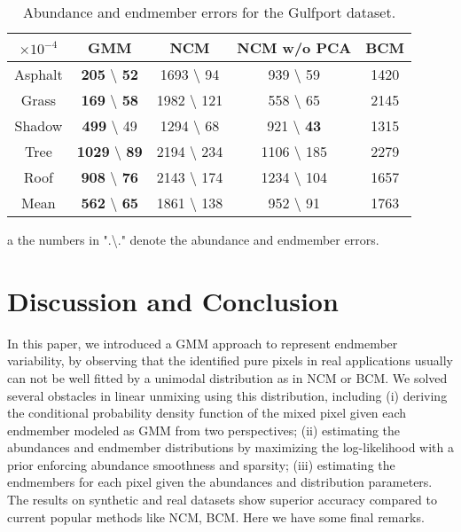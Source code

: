 \documentclass[twocolumn,english]{IEEEtran}
\providecommand{\tabularnewline}{\\}
\theoremstyle{plain}
\begin{document}
\begin{table}
\centering

\caption{Abundance and endmember errors for the Gulfport dataset.}

\begin{threeparttable}
\begin{centering}
\begin{tabular}{|c|c|c|c|c|}
\hline 
$\times10^{-4}$ &
GMM &
NCM &
NCM w/o PCA &
BCM\tabularnewline
\hline 
\hline 
Asphalt &
\textbf{205} \textbackslash{}\textbf{ 52}\tnote{a} &
1693 \textbackslash{}\textbf{ }94 &
939 \textbackslash{}\textbf{ }59 &
1420\tabularnewline
\hline 
Grass &
\textbf{169} \textbackslash{} \textbf{58} &
1982 \textbackslash{} 121 &
558 \textbackslash{} 65 &
2145\tabularnewline
\hline 
Shadow &
\textbf{499} \textbackslash{} 49 &
1294 \textbackslash{} 68 &
921 \textbackslash{} \textbf{43} &
1315\tabularnewline
\hline 
Tree &
\textbf{1029} \textbackslash{} \textbf{89} &
2194 \textbackslash{} 234 &
1106 \textbackslash{} 185 &
2279\tabularnewline
\hline 
Roof &
\textbf{908} \textbackslash{} \textbf{76} &
2143 \textbackslash{} 174 &
1234 \textbackslash{} 104 &
1657\tabularnewline
\hline 
Mean &
\textbf{562} \textbackslash{} \textbf{65} &
1861 \textbackslash{} 138 &
952 \textbackslash{} 91 &
1763\tabularnewline
\hline 
\end{tabular}
\par\end{centering}
\label{table:gulfport_abundances_error}

\begin{tablenotes} \item [a] the numbers in ".\textbackslash." denote the abundance and endmember errors. \end{tablenotes} \end{threeparttable}
\end{table}


\section{Discussion and Conclusion}

In this paper, we introduced a GMM approach to represent endmember
variability, by observing that the identified pure pixels in real
applications usually can not be well fitted by a unimodal distribution
as in NCM or BCM. We solved several obstacles in linear unmixing using
this distribution, including (i) deriving the conditional probability
density function of the mixed pixel given each endmember modeled as
GMM from two perspectives; (ii) estimating the abundances and endmember
distributions by maximizing the log-likelihood with a prior enforcing
abundance smoothness and sparsity; (iii) estimating the endmembers
for each pixel given the abundances and distribution parameters. The
results on synthetic and real datasets show superior accuracy compared
to current popular methods like NCM, BCM. Here we have some final
remarks.
\end{document}
